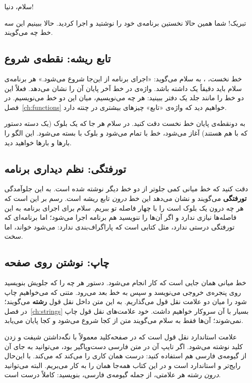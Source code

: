 \begin{outputfa}
سلام، دنیا!
\end{outputfa}

تبریک! شما همین حالا نخستین برنامه‌ی خود را نوشتید و اجرا کردید. حالا
ببینیم این سه خط چه می‌گویند.

\subsection{تابع ریشه: نقطه‌ی شروع}

خط نخست، ، به سلام می‌گوید: «اجرای برنامه از این‌جا شروع
می‌شود.» هر برنامه‌ی سلام باید دقیقاً یک  داشته باشد.
واژه‌ی  در خط آخر پایان آن را نشان می‌دهد. فعلاً این دو خط را
مانند جلد یک دفتر ببینید: هر چه می‌نویسیم، میان این دو خط می‌نویسیم. در فصل~\ref{ch:functions} خواهیم دید که واژه‌ی «تابع» چیزهای بیشتری در چنته دارد.

به دونقطه‌ی پایان خط نخست دقت کنید. در سلام هر جا که یک بلوک (یک دسته
دستور که با هم هستند) آغاز می‌شود، خط با \code{:} تمام می‌شود و بلوک با
 بسته می‌شود. این الگو را بارها و بارها خواهید دید.

\subsection{تورفتگی: نظم دیداری برنامه}

دقت کنید که خط میانی کمی جلوتر از دو خط دیگر نوشته شده است. به این
جلوآمدگی \textbf{تورفتگی} می‌گویند و نشان می‌دهد این خط \emph{درون} تابع ریشه است. رسم بر این است که هر چه درون یک بلوک است را با چهار فاصله تو
ببریم. سلام برای اجرای برنامه به این فاصله‌ها نیازی ندارد و اگر آن‌ها را
ننویسید هم برنامه اجرا می‌شود؛ اما برنامه‌ای که تورفتگی درستی ندارد، مثل
کتابی است که پاراگراف‌بندی ندارد: می‌شود خواند، اما سخت.

\subsection{چاپ: نوشتن روی صفحه}

خط میانی همان جایی است که کار انجام می‌شود. دستور  هر چه را که
جلویش بنویسید روی پنجره‌ی خروجی می‌نویسد و سپس به خط بعد می‌رود. متنی که
می‌خواهیم چاپ شود را میان دو علامت نقل قول  می‌گذاریم. به این متن
داخل نقل قول \textbf{رشته} می‌گویند؛ در فصل~\ref{ch:strings} بسیار با آن
سروکار خواهیم داشت. خود علامت‌های نقل قول چاپ نمی‌شوند؛ آن‌ها فقط به سلام
می‌گویند متن از کجا شروع می‌شود و کجا پایان می‌یابد.

\begin{tip}
علامت استاندارد نقل قول  است که در صفحه‌کلید معمولاً با نگه‌داشتن
شیفت و زدن کلید  نوشته می‌شود. اگر تایپ آن در متن فارسی دست‌وپاگیر
بود، می‌توانید به جای آن از گیومه‌ی فارسی  هم استفاده کنید:
 درست همان کاری را می‌کند که
 می‌کند. با این‌حال  رایج‌تر و استاندارد
است و در این کتاب همه‌جا همان را به کار می‌بریم. البته می‌توانید \emph{درون}
رشته هر علامتی، از جمله گیومه‌ی فارسی، بنویسید: 
کاملاً درست است.
\end{tip}

